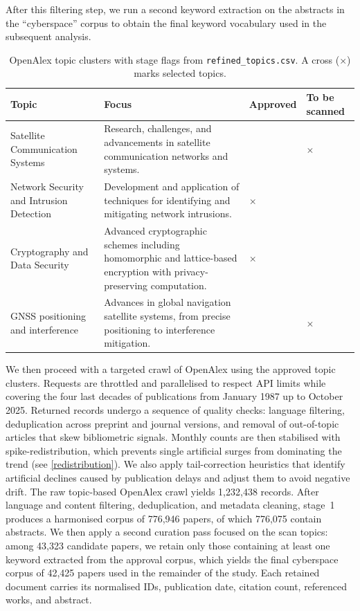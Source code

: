\documentclass{article}
\begin{document}
After this filtering step, we run a second keyword extraction on the abstracts in the ``cyberspace'' corpus to obtain the final keyword vocabulary used in the subsequent analysis.
\begin{table}[H]
\centering
\caption{OpenAlex topic clusters with stage flags from \texttt{refined\_topics.csv}. A cross (\(\times\)) marks selected topics.}
\label{tab:topics}
\begin{tabularx}{\textwidth}{@{}p{}X>{\centering\arraybackslash}p{}>{\centering\arraybackslash}p{}@{}}
\toprule
\textbf{Topic} & \textbf{Focus} & \textbf{Approved} & \textbf{To be scanned} \\
\midrule
Satellite Communication Systems & Research, challenges, and advancements in satellite communication networks and systems. &  & \(\times\) \\
\midrule
Network Security and Intrusion Detection & Development and application of techniques for identifying and mitigating network intrusions. & \(\times\) &  \\
\midrule
Cryptography and Data Security & Advanced cryptographic schemes including homomorphic and lattice-based encryption with privacy-preserving computation. & \(\times\) &  \\
\midrule
GNSS positioning and interference & Advances in global navigation satellite systems, from precise positioning to interference mitigation. &  & \(\times\) \\
\bottomrule
\end{tabularx}
\end{table}

We then proceed with a targeted crawl of OpenAlex using the approved topic clusters.
Requests are throttled and parallelised to respect API limits while covering the four last decades of publications from January 1987 up to October 2025.
Returned records undergo a sequence of quality checks: language filtering, deduplication across preprint and journal versions, and removal of out-of-topic articles that skew bibliometric signals.
Monthly counts are then stabilised with spike-redistribution, which prevents single artificial surges from dominating the trend (see \ref{redistribution}).
We also apply tail-correction heuristics that identify artificial declines caused by publication delays and adjust them to avoid negative drift.
The raw topic-based OpenAlex crawl yields 1,232,438 records. After language and content filtering, deduplication, and metadata cleaning, stage~1 produces a harmonised corpus of 776,946 papers, of which 776,075 contain abstracts. We then apply a second curation pass focused on the scan topics: among 43,323 candidate papers, we retain only those containing at least one keyword extracted from the approval corpus, which yields the final cyberspace corpus of 42,425 papers used in the remainder of the study. Each retained document carries its normalised IDs, publication date, citation count, referenced works, and abstract.
\end{document}
